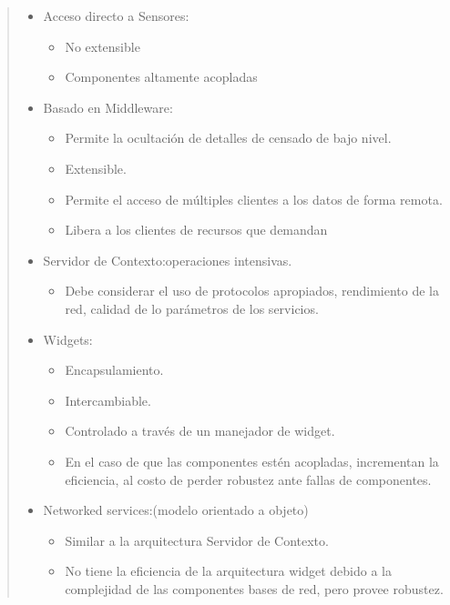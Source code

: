 \begin{quotation} 

\begin{itemize}
\item Acceso directo a Sensores:
	    \begin{itemize}
	       \item No extensible
	       \item Componentes altamente acopladas
	    \end{itemize}

\item Basado en Middleware: 	   
	      \begin{itemize}
	       \item Permite la ocultación de detalles de censado de bajo nivel.
	       \item Extensible.
	       \item Permite el acceso de múltiples clientes a los datos de
forma remota.
	       \item Libera a los clientes de recursos que demandan
	      \end{itemize}

\item Servidor de Contexto:operaciones intensivas.
	    \begin{itemize}
	       \item Debe considerar el uso de protocolos apropiados, rendimiento
de la red, calidad de lo parámetros de los servicios.
	    \end{itemize}

\item Widgets:
	  \begin{itemize}
	  \item Encapsulamiento.
	  \item Intercambiable.
	  \item Controlado a través de un manejador de widget.
	  \item En el caso de que las componentes estén acopladas, incrementan la
	  eficiencia, al costo de perder robustez ante fallas de componentes.
	  
	  \end{itemize}
\item Networked services:(modelo orientado a objeto) 
	\begin{itemize}
	\item Similar a la arquitectura Servidor de Contexto.
	\item No tiene la eficiencia de la arquitectura widget debido a la
    complejidad
	de las componentes bases de red, pero provee robustez.
	\end{itemize}


\end{itemize}
\end{quotation}
